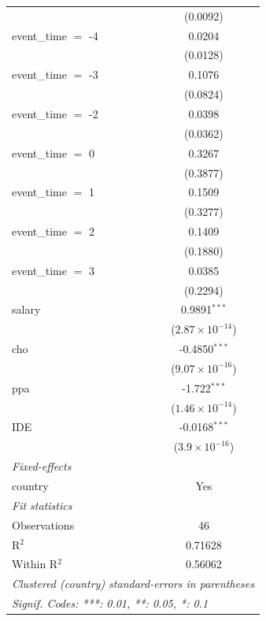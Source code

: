 \begin{tabular}{lc}
                        & (0.0092)\\   
   event\_time $=$ -4   & 0.0204\\   
                        & (0.0128)\\   
   event\_time $=$ -3   & 0.1076\\   
                        & (0.0824)\\   
   event\_time $=$ -2   & 0.0398\\   
                        & (0.0362)\\   
   event\_time $=$ 0    & 0.3267\\   
                        & (0.3877)\\   
   event\_time $=$ 1    & 0.1509\\   
                        & (0.3277)\\   
   event\_time $=$ 2    & 0.1409\\   
                        & (0.1880)\\   
   event\_time $=$ 3    & 0.0385\\   
                        & (0.2294)\\   
   salary               & 0.9891$^{***}$\\   
                        & ($2.87\times 10^{-14}$)\\    
   cho                  & -0.4850$^{***}$\\   
                        & ($9.07\times 10^{-16}$)\\    
   ppa                  & -1.722$^{***}$\\   
                        & ($1.46\times 10^{-14}$)\\    
   IDE                  & -0.0168$^{***}$\\   
                        & ($3.9\times 10^{-16}$)\\    
   \midrule
   \emph{Fixed-effects}\\
   country              & Yes\\  
   \midrule
   \emph{Fit statistics}\\
   Observations         & 46\\  
   R$^2$                & 0.71628\\  
   Within R$^2$         & 0.56062\\  
   \midrule \midrule
   \multicolumn{2}{l}{\emph{Clustered (country) standard-errors in parentheses}}\\
   \multicolumn{2}{l}{\emph{Signif. Codes: ***: 0.01, **: 0.05, *: 0.1}}\\
\end{tabular}
\par\endgroup
